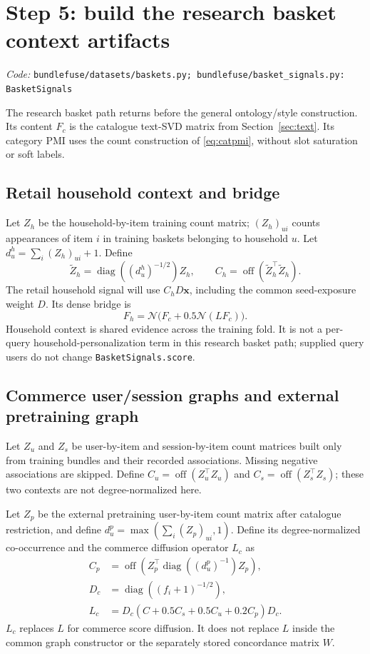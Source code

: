 \documentclass[11pt,a4paper]{article}
\newcommand{\code}[1]{\nolinkurl{#1}}
\newcommand{\src}[1]{\par\begingroup\raggedright\textit{Code: }\code{#1}\par\endgroup}
\newcommand{\diag}{\operatorname{diag}}
\newcommand{\off}{\operatorname{off}}
\newcommand{\normrows}{\mathcal N}
\numberwithin{equation}{section}
\begin{document}
\section{Step 5: build the research basket context artifacts}\label{sec:contexts}
\src{bundlefuse/datasets/baskets.py; bundlefuse/basket_signals.py: BasketSignals}
The research basket path returns before the general ontology/style construction. Its
content $F_c$ is the catalogue text-SVD matrix from Section~\ref{sec:text}. Its category
PMI uses the count construction of \eqref{eq:catpmi}, without slot saturation or soft labels.

\subsection{Retail household context and bridge}
Let $Z_h$ be the household-by-item training count matrix; $(Z_h)_{ui}$ counts appearances
of item $i$ in training baskets belonging to household $u$. Let
$d^h_u=\sum_i(Z_h)_{ui}+1$. Define
\begin{equation}
 \widetilde Z_h=\diag((d^h_u)^{-1/2})Z_h,
 \qquad C_h=\off(\widetilde Z_h^\top\widetilde Z_h).
\end{equation}
The retail household signal will use $C_hD\bm x$, including the common seed-exposure
weight $D$. Its dense bridge is
\begin{equation}
 F_h=\normrows\bigl(F_c+0.5\normrows(LF_c)\bigr).
\end{equation}
Household context is shared evidence across the training fold. It is not a per-query
household-personalization term in this research basket path; supplied query users do not
change \code{BasketSignals.score}.

\subsection{Commerce user/session graphs and external pretraining graph}
Let $Z_u$ and $Z_s$ be user-by-item and session-by-item count matrices built only from
training bundles and their recorded associations. Missing negative associations are skipped.
Define $C_u=\off(Z_u^\top Z_u)$ and $C_s=\off(Z_s^\top Z_s)$; these two contexts
are not degree-normalized here.

Let $Z_p$ be the external pretraining user-by-item count matrix after catalogue restriction,
and define $d^p_u=\max(\sum_i(Z_p)_{ui},1)$. Define its degree-normalized co-occurrence
and the commerce diffusion operator $L_c$ as
\begin{align}
 C_p&=\off\left(Z_p^\top\diag((d^p_u)^{-1})Z_p\right),\\
 D_c&=\diag((f_i+1)^{-1/2}),\\
 L_c&=D_c(C+0.5C_s+0.5C_u+0.2C_p)D_c.\label{eq:Lcommerce}
\end{align}
$L_c$ replaces $L$ for commerce score diffusion. It does not replace $L$ inside the
common graph constructor or the separately stored concordance matrix $W$.
\end{document}
